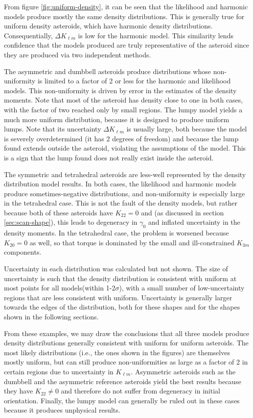 \documentclass[fleqn,usenatbib]{mnras}
\begin{document}
From figure \ref{fig:uniform-density}, it can be seen that the likelihood and harmonic models produce mostly the same density distributions. This is generally true for uniform density asteroids, which have harmonic density distributions. Consequentially, $\Delta K_{\ell m}$ is low for the harmonic model. This similarity lends confidence that the models produced are truly representative of the asteroid since they are produced via two independent methods.

The asymmetric and dumbbell asteroids produce distributions whose non-uniformity is limited to a factor of 2 or less for the harmonic and likelihood models. This non-uniformity is driven by error in the estimates of the density moments. Note that most of the asteroid has density close to one in both cases, with the factor of two reached only by small regions. The lumpy model yields a much more uniform distribution, because it is designed to produce uniform lumps. Note that its uncertainty $\Delta K_{\ell m}$ is usually large, both because the model is severely overdetermined (it has 2 degrees of freedom) and because the lump found extends outside the asteroid, violating the assumptions of the model. This is a sign that the lump found does not really exist inside the asteroid.

The symmetric and tetrahedral asteroids are less-well represented by the density distribution model results. In both cases, the likelihood and harmonic models produce sometimes-negative distributions, and non-uniformity is especially large in the tetrahedral case. This is not the fault of the density models, but rather because both of these asteroids have $K_{22} = 0$ and (as discussed in section \ref{sec:scan-shape}), this leads to degeneracy in $\gamma_0$ and inflated uncertainty in the density moments. In the tetrahedral case, the problem is worsened because $K_{20}=0$ as well, so that torque is dominated by the small and ill-constrained $K_{3m}$ components.

Uncertainty in each distribution was calculated but not shown. The size of uncertainty is such that the density distribution is consistent with uniform at most points for all models(within 1-2$\sigma$), with a small number of low-uncertainty regions that are less consistent with uniform. Uncertainty is generally larger towards the edges of the distribution, both for these shapes and for the shapes shown in the following sections.

From these examples, we may draw the conclusions that all three models produce density distributions generally consistent with uniform for uniform asteroids. The most likely distributions (i.e., the ones shown in the figures) are themselves mostly uniform, but can still produce non-uniformities as large as a factor of 2 in certain regions due to uncertainty in $K_{\ell m}$. Asymmetric asteroids such as the dumbbell and the asymmetric reference asteroids yield the best results because they have $K_{22} \neq 0$ and therefore do not suffer from degeneracy in initial orientation. Finally, the lumpy model can generally be ruled out in these cases because it produces unphysical results.
\end{document}
